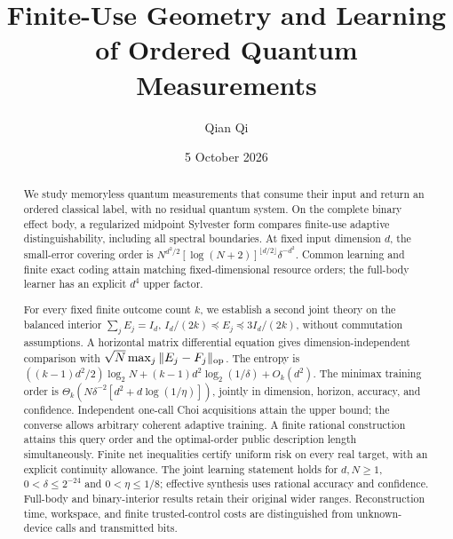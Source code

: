 \documentclass[11pt]{amsart}
\title[Finite-use measurement geometry and learning]{Finite-Use Geometry and Learning of Ordered Quantum Measurements}
\author{Qian Qi}
\date{5 October 2026}
\numberwithin{equation}{section}
\theoremstyle{definition}\newtheorem{definition}[theorem]{Definition}
\theoremstyle{remark}\newtheorem{remark}[theorem]{Remark}
\begin{document}
\raggedbottom
\begin{abstract}
We study memoryless quantum measurements that consume their input and
return an ordered classical label, with no residual quantum system.
On the complete binary effect body, a regularized midpoint Sylvester
form compares finite-use adaptive distinguishability, including all
spectral boundaries.  At fixed input dimension $d$, the small-error
covering order is
$N^{d^2/2}[\log(N+2)]^{\lfloor d/2\rfloor}\delta^{-d^2}$.
Common learning and finite exact coding attain matching
fixed-dimensional resource orders; the full-body learner has an
explicit $d^4$ upper factor.

For every fixed finite outcome count $k$, we establish a second
joint theory on the balanced interior
$\sum_jE_j=I_d$, $I_d/(2k)\preceq E_j\preceq3I_d/(2k)$,
without commutation assumptions.  A horizontal matrix differential
equation gives dimension-independent comparison with
$\sqrt N\max_j\|E_j-F_j\|_{\rm op}$.
The entropy is
$((k-1)d^2/2)\log_2N+(k-1)d^2\log_2(1/\delta)+O_k(d^2)$.
The minimax training order is
$\Theta_k(N\delta^{-2}[d^2+d\log(1/\eta)])$,
jointly in dimension, horizon, accuracy, and confidence.
Independent one-call Choi acquisitions attain the upper bound;
the converse allows arbitrary coherent adaptive training.
A finite rational construction attains this query order and the
optimal-order public description length simultaneously.
Finite net inequalities certify uniform risk on every real target,
with an explicit continuity allowance.
The joint learning statement holds for $d,N\ge1$,
$0<\delta\le2^{-24}$ and $0<\eta\le1/8$; effective synthesis uses
rational accuracy and confidence.  Full-body and binary-interior
results retain their original wider ranges.  Reconstruction time,
workspace, and finite trusted-control costs are distinguished from
unknown-device calls and transmitted bits.
\end{abstract}
\maketitle



















\appendix


\end{document}
